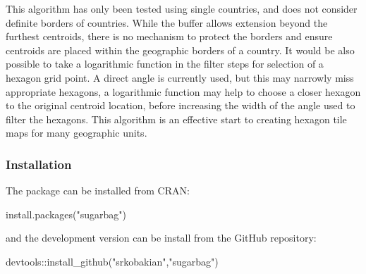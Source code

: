 This algorithm has only been tested using single countries, and does not
consider definite borders of countries. While the buffer allows
extension beyond the furthest centroids, there is no mechanism to
protect the borders and ensure centroids are placed within the
geographic borders of a country. It would be also possible to take a
logarithmic function in the filter steps for selection of a hexagon grid
point. A direct angle is currently used, but this may narrowly miss
appropriate hexagons, a logarithmic function may help to choose a closer
hexagon to the original centroid location, before increasing the width
of the angle used to filter the hexagons. This algorithm is an effective
start to creating hexagon tile maps for many geographic units.

\hypertarget{installation}{%
\subsubsection{Installation}\label{installation}}

The package can be installed from CRAN:

\begin{Schunk}
\begin{Sinput}
install.packages("sugarbag")
\end{Sinput}
\end{Schunk}

and the development version can be install from the GitHub repository:

\begin{Schunk}
\begin{Sinput}
devtools::install_github("srkobakian","sugarbag")
\end{Sinput}
\end{Schunk}



\address{%
Stephanie Kobakian\\
Monash University\\%
Department of Econometrics and Business Statistics\\
%
%
%
\\\href{mailto:stephanie.kobakian@monash.edu}{\nolinkurl{stephanie.kobakian@monash.edu}}
}

\address{%
Dianne Cook\\
Monash University\\%
Department of Econometrics and Business Statistics\\
%
%
%
\\\href{mailto:dicook@monash.edu}{\nolinkurl{dicook@monash.edu}}
}
